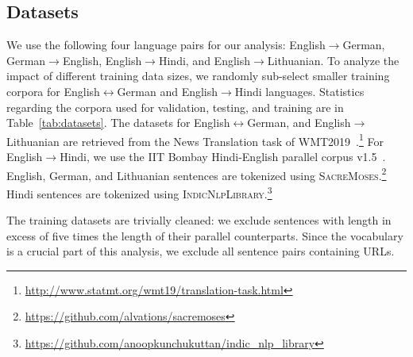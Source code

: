 \subsection{Datasets}
We use the following four language pairs for our analysis: English$\rightarrow$German, German$\rightarrow$English, English$\rightarrow$Hindi, and English$\rightarrow$Lithuanian. 
To analyze the impact of different training data sizes, we randomly sub-select smaller training corpora for English$\leftrightarrow$German and English$\rightarrow$Hindi languages. 
Statistics regarding the corpora used for validation, testing, and training are in Table~\ref{tab:datasets}.
The datasets for English$\leftrightarrow$German, and English$\rightarrow$Lithuanian are retrieved from the News Translation task of WMT2019~\cite{wmt19proceedings}.\footnote{\href{http://www.statmt.org/wmt19/translation-task.html}{http://www.statmt.org/wmt19/translation-task.html}}
For English$\rightarrow$Hindi, we use the IIT Bombay Hindi-English parallel corpus v1.5~\cite{kunchukuttan-etal-2018-iit}.
English, German, and Lithuanian sentences are tokenized using \textsc{SacreMoses}.\footnote{\href{https://github.com/alvations/sacremoses}{https://github.com/alvations/sacremoses}} 
Hindi sentences are tokenized using \textsc{IndicNlpLibrary}.\footnote{\href{https://github.com/anoopkunchukuttan/indic_nlp_library}{https://github.com/anoopkunchukuttan/indic\_nlp\_library}}

The training datasets are trivially cleaned: we exclude sentences with length in excess of five times the length of their parallel counterparts. 
Since the vocabulary is a crucial part of this analysis, we exclude all sentence pairs containing URLs. 

